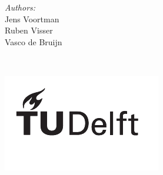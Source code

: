 \begin{titlepage}
\begin{minipage}{0.4\textwidth}
\begin{flushleft} \large
\emph{Authors:}\\
Jens Voortman\\
Ruben Visser\\
Vasco de Bruijn
\end{flushleft}
\end{minipage}
~
\begin{minipage}{0.4\textwidth}
\begin{flushright} \large
\includegraphics{logo/logo_black}
\end{flushright}
\end{minipage}



\vfill
\end{titlepage}